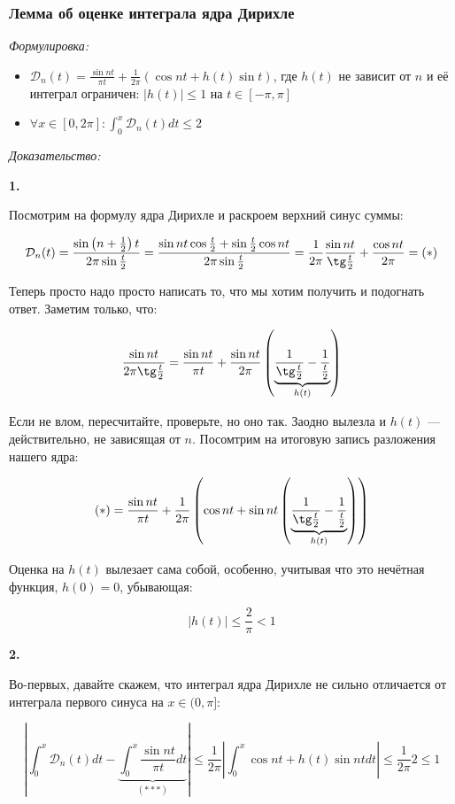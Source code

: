 \documentclass{article}
\def\DD{\mathcal{D}}
\begin{document}
\subsubsection{Лемма об оценке интеграла ядра Дирихле}
\textit{Формулировка:}

\begin{itemize}
    \item $\DD_n(t) = \frac{\sin nt}{\pi t} + \frac{1}{2\pi}(\cos nt + h(t)\sin t)$, где $h(t)$ не зависит от $n$ и её интеграл ограничен: $|h(t)| \le 1$ на $t \in [-\pi, \pi]$
    \item $\forall x \in [0, 2\pi] : \int_{0}^{x} \DD_n(t) dt \le 2$
\end{itemize}

\textit{Доказательство:}

\textbf{1.}

Посмотрим на формулу ядра Дирихле и раскроем верхний синус суммы:

\[\DD_n(t) = \frac{\sin \left(n + \frac{1}{2}\right)t}{2\pi\sin \frac{t}{2}} = \frac{\sin nt \cos\frac{t}{2} + \sin \frac{t}{2} \cos nt}{2\pi\sin \frac{t}{2}} = \frac{1}{2\pi}\frac{\sin nt}{\tg \frac{t}{2}} + \frac{\cos nt}{2\pi} = (*)\]

Теперь просто надо просто написать то, что мы хотим получить и подогнать ответ. Заметим только, что:

\[ \frac{\sin nt}{2 \pi \tg \frac{t}{2}} = \frac{\sin nt}{\pi t} + \frac{\sin nt}{2 \pi} \left(\underbrace{\frac{1}{\tg \frac{t}{2}} - \frac{1}{\frac{t}{2}}}_{h(t)}\right)\]

Если не влом, пересчитайте, проверьте, но оно так. Заодно вылезла и $h(t)$ --- действительно, не зависящая от $n$. Посомтрим на итоговую запись разложения нашего ядра:

\[(*) = \frac{\sin nt}{\pi t} + \frac{1}{2\pi} \left( \cos nt + \sin nt \left(\underbrace{\frac{1}{\tg \frac{t}{2}} - \frac{1}{\frac{t}{2}}}_{h(t)}\right) \right)\]

Оценка на $h(t)$ вылезает сама собой, особенно, учитывая что это нечётная функция, $h(0) = 0$, убывающая:

\[|h(t)| \le \frac{2}{\pi} < 1\]

\textbf{2.}

Во-первых, давайте скажем, что интеграл ядра Дирихле не сильно отличается от интеграла первого синуса на $x \in (0, \pi]$:

\[\left| \int_{0}^{x} \DD_n(t) dt - \underbrace{\int_{0}^{x} \frac{\sin nt}{\pi t} dt}_{(***)}\right| \le \frac{1}{2\pi}\left|\int_{0}^{x} \cos nt + h(t)\sin nt dt\right| \le \frac{1}{2\pi} 2 \le 1\]
\end{document}
